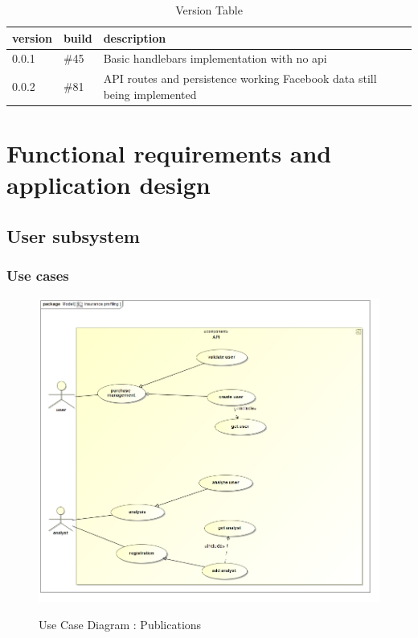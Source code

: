 \documentclass{article}
\begin{document}
	\begin{table}[H]
	\centering
	\caption{Version Table}
	\label{my-label}
	\begin{tabular}{|l|l|l|l|l|}
	\hline
	version 	& build 	& description 		\\ \hline
	0.0.1		& \#45 		& Basic handlebars implementation with no api					\\
	0.0.2		& \#81 		& API routes and persistence working Facebook data still being implemented	\\ \hline
	\end{tabular}
	\end{table}

\section{Functional requirements and application design}
	\subsection{User subsystem}
		\subsubsection{Use cases}

		\begin{figure}[H]
		\includegraphics[width=\textwidth]{images/uc__Insurance_profiling.jpg}  \\
		\caption{Use Case Diagram : Publications}
		\end{figure}
\end{document}
